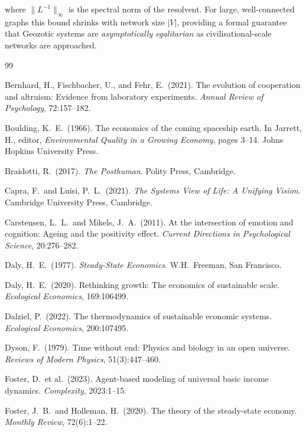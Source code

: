 \documentclass[12pt,a4paper]{article}
\theoremstyle{definition}
\begin{document}
where $\|L^{-1}\|_\infty$ is the spectral norm of the resolvent.  For
large, well-connected graphs this bound shrinks with network size $|V|$,
providing a formal guarantee that Geozotic systems are \emph{asymptotically
egalitarian} as civilisational-scale networks are approached.

\newpage
\begin{thebibliography}{99}

Bernhard, H., Fischbacher, U., and Fehr, E.\ (2021).
The evolution of cooperation and altruism: Evidence from laboratory
experiments.
\textit{Annual Review of Psychology}, 72:157--182.

Boulding, K.\ E.\ (1966).
The economics of the coming spaceship earth.
In Jarrett, H., editor, \textit{Environmental Quality in a Growing Economy},
pages 3--14. Johns Hopkins University Press.

Braidotti, R.\ (2017).
\textit{The Posthuman}.
Polity Press, Cambridge.

Capra, F.\ and Luisi, P.\ L.\ (2021).
\textit{The Systems View of Life: A Unifying Vision}.
Cambridge University Press, Cambridge.

Carstensen, L.\ L.\ and Mikels, J.\ A.\ (2011).
At the intersection of emotion and cognition: Ageing and the positivity effect.
\textit{Current Directions in Psychological Science}, 20:276--282.

Daly, H.\ E.\ (1977).
\textit{Steady-State Economics}.
W.H.\ Freeman, San Francisco.

Daly, H.\ E.\ (2020).
Rethinking growth: The economics of sustainable scale.
\textit{Ecological Economics}, 169:106499.

Dalziel, P.\ (2022).
The thermodynamics of sustainable economic systems.
\textit{Ecological Economics}, 200:107495.

Dyson, F.\ (1979).
Time without end: Physics and biology in an open universe.
\textit{Reviews of Modern Physics}, 51(3):447--460.

Foster, D.\ et al.\ (2023).
Agent-based modeling of universal basic income dynamics.
\textit{Complexity}, 2023:1--15.

Foster, J.\ B.\ and Holleman, H.\ (2020).
The theory of the steady-state economy.
\textit{Monthly Review}, 72(6):1--22.


\end{thebibliography}
\end{document}
